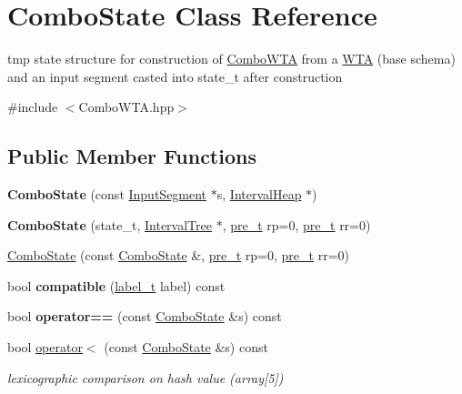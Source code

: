 \hypertarget{classComboState}{}\section{Combo\+State Class Reference}
\label{classComboState}


tmp state structure for construction of \mbox{\hyperlink{classComboWTA}{Combo\+W\+TA}} from a \mbox{\hyperlink{classWTA}{W\+TA}} (base schema) and an input segment casted into state\+\_\+t after construction  




{\ttfamily \#include $<$Combo\+W\+T\+A.\+hpp$>$}

\subsection*{Public Member Functions}
\begin{DoxyCompactItemize}
\item 
{\bfseries Combo\+State} (const \mbox{\hyperlink{classInputSegment}{Input\+Segment}} $\ast$s, \mbox{\hyperlink{classIntervalHeap}{Interval\+Heap}} $\ast$)
\item 
{\bfseries Combo\+State} (state\+\_\+t, \mbox{\hyperlink{classIntervalTree}{Interval\+Tree}} $\ast$, \mbox{\hyperlink{group__general_ga092fe8b972dfa977c2a0886720a7731e}{pre\+\_\+t}} rp=0, \mbox{\hyperlink{group__general_ga092fe8b972dfa977c2a0886720a7731e}{pre\+\_\+t}} rr=0)
\item 
\mbox{\hyperlink{group__schemata_gad80378e34fdc145bd7f0dac17c306e39}{Combo\+State}} (const \mbox{\hyperlink{classComboState}{Combo\+State}} \&, \mbox{\hyperlink{group__general_ga092fe8b972dfa977c2a0886720a7731e}{pre\+\_\+t}} rp=0, \mbox{\hyperlink{group__general_ga092fe8b972dfa977c2a0886720a7731e}{pre\+\_\+t}} rr=0)
\item 
bool {\bfseries compatible} (\mbox{\hyperlink{group__output_ga22fde970e635fcf63962743b2d5c441d}{label\+\_\+t}} label) const
\item 
bool {\bfseries operator==} (const \mbox{\hyperlink{classComboState}{Combo\+State}} \&s) const
\item 
bool \mbox{\hyperlink{group__schemata_ga505e9ff93681bbfe5632a15708facb63}{operator$<$}} (const \mbox{\hyperlink{classComboState}{Combo\+State}} \&s) const
\begin{DoxyCompactList}\small\item\em lexicographic comparison on hash value (array\mbox{[}5\mbox{]}) \end{DoxyCompactList}\end{DoxyCompactItemize}
